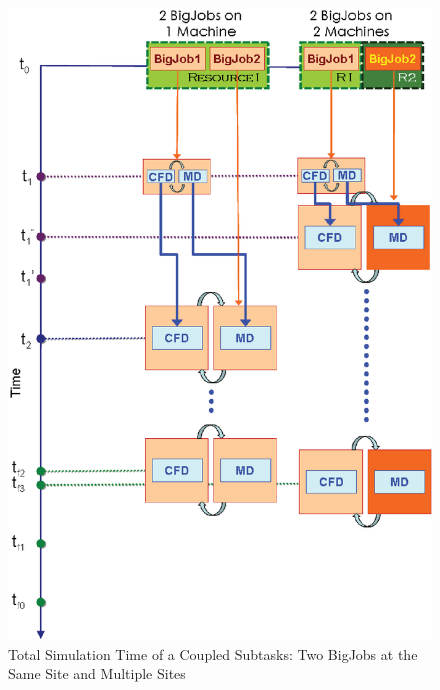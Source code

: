 \documentclass[conference,final]{IEEEtran}
\begin{document}
\begin{figure}
\centering
\includegraphics[scale=0.40]{Simulation_Time_of_Two_BigJobs.eps}
\caption{\small Total Simulation Time of a Coupled Subtasks: Two BigJobs at the Same Site and Multiple Sites}
\label{Fig:TwoBigJobs}
\end{figure}
\end{document}
